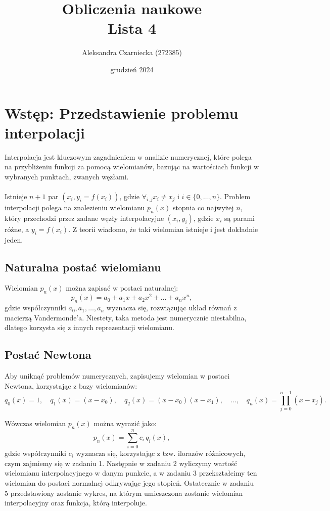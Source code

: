 \documentclass{article}
\title{\textbf{Obliczenia naukowe \\ \large Lista 4}}
\author{Aleksandra Czarniecka (272385)}
\date{grudzień 2024}
\begin{document}
\maketitle
\section*{Wstęp: Przedstawienie problemu interpolacji}
Interpolacja jest kluczowym zagadnieniem w analizie numerycznej, które polega na przybliżeniu funkcji za pomocą wielomianów, bazując na wartościach funkcji w wybranych punktach, zwanych węzłami.
\\ \\
Istnieje $n+1$ par $(x_i, y_i = f(x_i))$, gdzie $\forall_{i, j} x_i \neq x_j$ i $i \in \{0, \dots, n\}$. 
Problem interpolacji polega na znalezieniu wielomianu \(p_n(x)\) stopnia co najwyżej \(n\), który przechodzi przez zadane węzły interpolacyjne \((x_i, y_i)\), gdzie \(x_i\) są parami różne, a \(y_i = f(x_i)\). Z teorii wiadomo, że taki wielomian istnieje i jest dokładnie jeden.

\subsection*{Naturalna postać wielomianu}

Wielomian \(p_n(x)\) można zapisać w postaci naturalnej:
\[
p_n(x) = a_0 + a_1x + a_2x^2 + \ldots + a_nx^n,
\]
gdzie współczynniki \(a_0, a_1, \ldots, a_n\) wyznacza się, rozwiązując układ równań z macierzą Vandermonde’a. Niestety, taka metoda jest numerycznie niestabilna, dlatego korzysta się z innych reprezentacji wielomianu.

\subsection*{Postać Newtona}

Aby uniknąć problemów numerycznych, zapisujemy wielomian w postaci Newtona, korzystając z bazy wielomianów:
\[
q_0(x) = 1, \quad q_1(x) = (x - x_0), \quad q_2(x) = (x - x_0)(x - x_1), \quad \ldots, \quad q_n(x) = \prod_{j=0}^{n-1}(x - x_j).
\]

Wówczas wielomian \(p_n(x)\) można wyrazić jako:
\[
p_n(x) = \sum_{i=0}^n c_i \, q_i(x),
\]
gdzie współczynniki \(c_i\) wyznacza się, korzystając z tzw. ilorazów różnicowych, czym zajmiemy się w zadaniu 1. Następnie w zadaniu 2 wyliczymy wartość wielomianu interpolacyjnego w danym punkcie, a w zadaniu 3 przekształcimy ten wielomian do postaci normalnej odkrywając jego stopień. Ostatecznie w zadaniu 5 przedstawiony zostanie wykres, na którym umieszczona zostanie wielomian interpolacyjny oraz funkcja, którą interpoluje.
\end{document}
